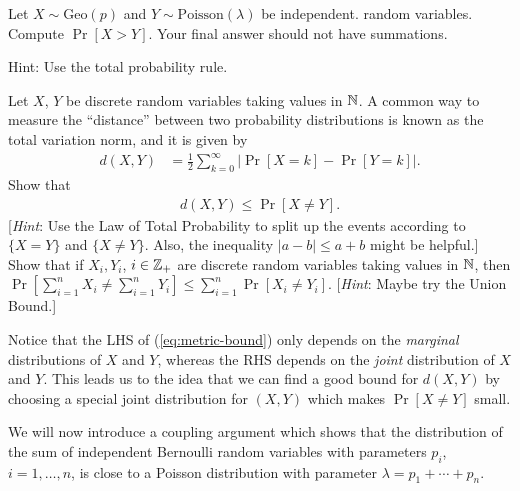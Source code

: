 \documentclass[11pt]{article}
\begin{document}
Let $X\sim \text{Geo}(p)$ and $Y\sim \text{Poisson}(\lambda)$ be independent. random variables. Compute $\Pr[X>Y]$. Your final answer should not have summations.

Hint: Use the total probability rule.
\pagebreak 
{}

\begin{Parts}
    \Part Let $X$, $Y$ be discrete random variables taking values in $\mathbb{N}$.
    A common way to measure the ``distance'' between two probability distributions is known as the total variation norm, and it is given by
    \begin{align*}
        d(X, Y) &= \frac{1}{2} \sum_{k=0}^\infty |\Pr[X = k] - \Pr[Y = k]|.
    \end{align*}
    Show that
    \begin{align} \label{eq:metric-bound}
        d(X, Y) \leq \Pr[X \neq Y].
    \end{align}
    [\textit{Hint}: Use the Law of Total Probability to split up the events according to $\{X = Y\}$ and $\{X \neq Y\}$. Also, the inequality $|a - b| \leq a + b$ might be helpful.]
    \Part Show that if $X_i, Y_i$, $i \in \mathbb{Z}_+$ are discrete random variables taking values in $\mathbb{N}$, then $\Pr[\sum_{i=1}^n X_i \neq \sum_{i=1}^n Y_i] \leq \sum_{i=1}^n \Pr[X_i \neq Y_i]$.
    [\textit{Hint}: Maybe try the Union Bound.]
\end{Parts}

Notice that the LHS of (\ref{eq:metric-bound}) only depends on the \textit{marginal} distributions of $X$ and $Y$, whereas the RHS depends on the \textit{joint} distribution of $X$ and $Y$.
This leads us to the idea that we can find a good bound for $d(X, Y)$ by choosing a special joint distribution for $(X, Y)$ which makes $\Pr[X \ne Y]$ small.

We will now introduce a coupling argument which shows that the distribution of the sum of independent Bernoulli random variables with parameters $p_i$, $i = 1, \dotsc, n$, is close to a Poisson distribution with parameter $\lambda = p_1 + \cdots + p_n$.
\end{document}
